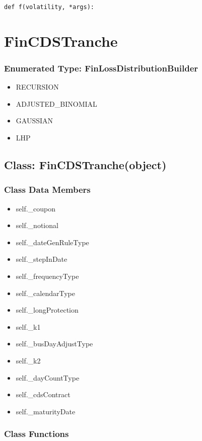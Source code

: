 \documentclass[twoside,11pt]{book}
\begin{document}
\begin{lstlisting}
def f(volatility, *args):
\end{lstlisting}

\newpage
\section{FinCDSTranche}

\subsubsection{Enumerated Type: FinLossDistributionBuilder}
\begin{itemize}
\item{RECURSION}
\item{ADJUSTED\_BINOMIAL}
\item{GAUSSIAN}
\item{LHP}
\end{itemize}

\subsection{Class: FinCDSTranche(object)}


\subsubsection{Class Data Members}
\begin{itemize}
\item{self.\_coupon}
\item{self.\_notional}
\item{self.\_dateGenRuleType}
\item{self.\_stepInDate}
\item{self.\_frequencyType}
\item{self.\_calendarType}
\item{self.\_longProtection}
\item{self.\_k1}
\item{self.\_busDayAdjustType}
\item{self.\_k2}
\item{self.\_dayCountType}
\item{self.\_cdsContract}
\item{self.\_maturityDate}
\end{itemize}

\subsubsection{Class Functions}
\end{document}
